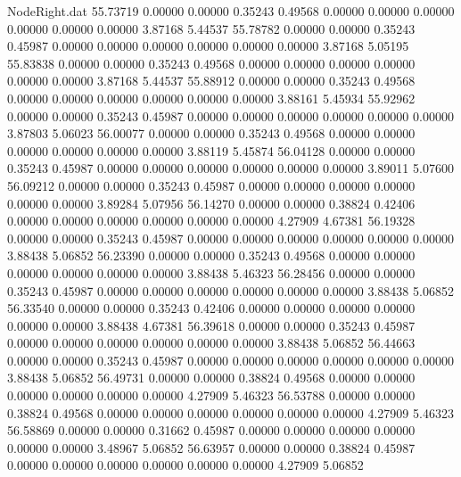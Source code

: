 \begin{filecontents}{NodeRight.dat}
  55.73719    0.00000    0.00000     0.35243    0.49568    0.00000    0.00000    0.00000    0.00000    0.00000    0.00000    3.87168    5.44537
  55.78782    0.00000    0.00000     0.35243    0.45987    0.00000    0.00000    0.00000    0.00000    0.00000    0.00000    3.87168    5.05195
  55.83838    0.00000    0.00000     0.35243    0.49568    0.00000    0.00000    0.00000    0.00000    0.00000    0.00000    3.87168    5.44537
  55.88912    0.00000    0.00000     0.35243    0.49568    0.00000    0.00000    0.00000    0.00000    0.00000    0.00000    3.88161    5.45934
  55.92962    0.00000    0.00000     0.35243    0.45987    0.00000    0.00000    0.00000    0.00000    0.00000    0.00000    3.87803    5.06023
  56.00077    0.00000    0.00000     0.35243    0.49568    0.00000    0.00000    0.00000    0.00000    0.00000    0.00000    3.88119    5.45874
  56.04128    0.00000    0.00000     0.35243    0.45987    0.00000    0.00000    0.00000    0.00000    0.00000    0.00000    3.89011    5.07600
  56.09212    0.00000    0.00000     0.35243    0.45987    0.00000    0.00000    0.00000    0.00000    0.00000    0.00000    3.89284    5.07956
  56.14270    0.00000    0.00000     0.38824    0.42406    0.00000    0.00000    0.00000    0.00000    0.00000    0.00000    4.27909    4.67381
  56.19328    0.00000    0.00000     0.35243    0.45987    0.00000    0.00000    0.00000    0.00000    0.00000    0.00000    3.88438    5.06852
  56.23390    0.00000    0.00000     0.35243    0.49568    0.00000    0.00000    0.00000    0.00000    0.00000    0.00000    3.88438    5.46323
  56.28456    0.00000    0.00000     0.35243    0.45987    0.00000    0.00000    0.00000    0.00000    0.00000    0.00000    3.88438    5.06852
  56.33540    0.00000    0.00000     0.35243    0.42406    0.00000    0.00000    0.00000    0.00000    0.00000    0.00000    3.88438    4.67381
  56.39618    0.00000    0.00000     0.35243    0.45987    0.00000    0.00000    0.00000    0.00000    0.00000    0.00000    3.88438    5.06852
  56.44663    0.00000    0.00000     0.35243    0.45987    0.00000    0.00000    0.00000    0.00000    0.00000    0.00000    3.88438    5.06852
  56.49731    0.00000    0.00000     0.38824    0.49568    0.00000    0.00000    0.00000    0.00000    0.00000    0.00000    4.27909    5.46323
  56.53788    0.00000    0.00000     0.38824    0.49568    0.00000    0.00000    0.00000    0.00000    0.00000    0.00000    4.27909    5.46323
  56.58869    0.00000    0.00000     0.31662    0.45987    0.00000    0.00000    0.00000    0.00000    0.00000    0.00000    3.48967    5.06852
  56.63957    0.00000    0.00000     0.38824    0.45987    0.00000    0.00000    0.00000    0.00000    0.00000    0.00000    4.27909    5.06852

\end{filecontents}
